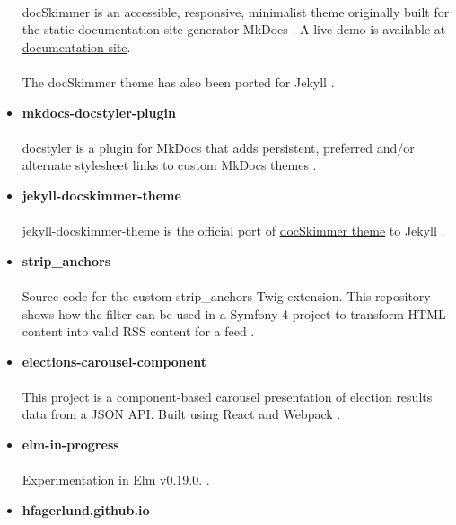 \documentclass[11pt]{article}
\begin{document}
\begin{itemize}
\paragraph{}
docSkimmer is an accessible, responsive, minimalist theme originally built for the static documentation site-generator MkDocs \cite{mkdocs-docskimmer}. A live demo is available at \href{http://bitsof.bytesofdesign.com/mkdocs-docskimmer/}{documentation site}.
\paragraph{}
The docSkimmer theme has also been ported for Jekyll \cite{jekyll-docskimmer}.
\item \textbf{mkdocs-docstyler-plugin}
\paragraph{}
docstyler is a plugin for MkDocs that adds persistent, preferred
and/or alternate stylesheet links to custom MkDocs themes \cite{mkdocs-docstyler-plugin}.
\item \textbf{jekyll-docskimmer-theme}
 \paragraph{}
jekyll-docskimmer-theme is the official port of \href{https://github.com/hfagerlund/mkdocs-docskimmer}{docSkimmer theme} to Jekyll \cite{jekyll-docskimmer}.
\item \textbf{strip\_anchors}
\paragraph{}
Source code for the custom strip\_anchors Twig extension. This repository shows how the filter can be used in a Symfony 4 project to transform HTML content into valid RSS content for a feed \cite{stripanchors}.
\item \textbf{elections-carousel-component}
\paragraph{}
This project is a component-based carousel presentation of election results data from a JSON API. Built using React and Webpack \cite{elections-carousel-component}.
\item \textbf{elm-in-progress}
\paragraph{}
Experimentation in Elm v0.19.0.
 \cite{elm}.
\item \textbf{hfagerlund.github.io}

\end{itemize}
\end{document}
